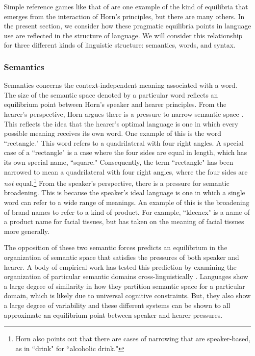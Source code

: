 \documentclass[man, noapacite, 12pt]{apa2}
\begin{document}
Simple reference games like that of  are one example of the kind of equilibria that emerges from the interaction of Horn's principles, but there are many others. In the present section, we consider how these  pragmatic equilibria points in language use are reflected in the structure of language. We will consider this relationship for three different kinds of linguistic structure: semantics, words, and syntax.

\subsubsection{Semantics}
Semantics concerns the context-independent meaning associated with a word. The size of the semantic space denoted by a particular word reflects an equilibrium point between Horn's speaker and hearer principles.  From the hearer's perspective, Horn argues there is a pressure  to narrow semantic space \cite{horn1984}. This reflects the idea that the hearer's optimal language is one in which every possible meaning receives its own word. One example of this is the word ``rectangle." This word refers to a quadrilateral with four right angles. A special case of a ``rectangle"  is a case where the four sides are equal in length, which has its own special name, ``square." Consequently, the term ``rectangle" has been narrowed to mean a quadrilateral with four right angles, where the four sides are {\it not} equal.\footnote{Horn also points out that there are cases of narrowing that are speaker-based, as in ``drink" for ``alcoholic drink."} From the speaker's perspective, there is a pressure for semantic broadening. This is because the speaker's ideal language is one in which a single word can refer to a wide range of meanings. An example of this is the broadening of brand names to refer to a kind of product. For example, ``kleenex" is a name of a product name for facial tissues, but has taken on the meaning of facial tissues more generally.

The opposition of these two semantic forces predicts an equilibrium in the organization of semantic space that satisfies the pressures of both speaker and hearer. A body of empirical work has tested this prediction by examining the organization of particular semantic domains cross-linguistically \cite{regierword}. Languages show a large degree of similarity in how they partition semantic space for a particular domain, which is likely due to universal cognitive constraints. But, they also show a large degree of variability and these different systems can be shown to all approximate an equilibrium point between speaker and hearer pressures. 
\end{document}
